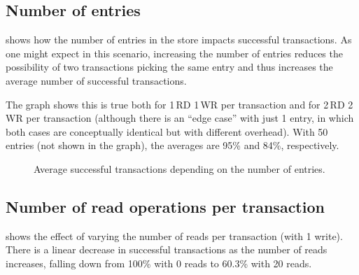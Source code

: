 \documentclass[a4paper, 10pt]{article}
\begin{document}
\subsection{Number of entries}

 shows how the number of entries in the store impacts successful transactions.
As one might expect in this scenario, increasing the number of entries reduces the possibility of two transactions picking the same entry and thus increases the average number of successful transactions.

The graph shows this is true both for 1\,RD 1\,WR per transaction and for 2\,RD 2\,WR per transaction (although there is an ``edge case'' with just 1 entry, in which both cases are conceptually identical but with different overhead).
With 50 entries (not shown in the graph), the averages are 95\% and 84\%, respectively.

\begin{figure}[htp]
\begin{center}
\caption{Average successful transactions depending on the  number of entries.}
\label{fig:nentries}
\end{center}
\end{figure}


\subsection{Number of read operations per transaction}

 shows the effect of varying the number of reads per transaction (with 1 write).
There is a linear decrease in successful transactions as the number of reads increases, falling down from 100\% with 0 reads to 60.3\% with 20 reads.
\end{document}
